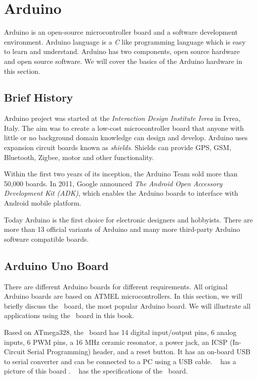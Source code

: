 \section {Arduino}
Arduino is an open-source microcontroller board and a software
development environment. Arduino language is a \emph{C} like
programming language which is easy to learn and understand.  Arduino
has two components, open source hardware and open source software.  We
will cover the basics of the Arduino hardware in this section.

\subsection{Brief History}
Arduino project was started at the \emph{Interaction Design Institute
  Ivrea} in Ivrea, Italy. The aim was to create a low-cost
microcontroller board that anyone with little or no background domain
knowledge can design and develop. Arduino uses expansion circuit
boards known as \emph{shields}. Shields can provide GPS, GSM,
Bluetooth, Zigbee, motor and other functionality.

Within the first two years of its inception, the Arduino Team sold
more than 50,000 boards. In 2011, Google announced \emph{The Android
  Open Accessory Development Kit (ADK)}, which enables the Arduino boards to
interface with Android mobile platform.

Today Arduino is the first choice for electronic designers and
hobbyists. There are  more than 13 official variants of Arduino and
many more third-party Arduino software compatible boards.

\subsection{Arduino Uno Board}
There are different Arduino boards for different requirements. All
original Arduino boards are based on ATMEL microcontrollers.  In this
section, we will briefly discuss the \arduino\ board, the most popular
Arduino board.  We will illustrate all applications using the
\arduino\ board in this book.

Based on ATmega328, the \arduino\ board has 14 digital input/output
pins, 6 analog inputs, 6 PWM pins, a 16 MHz ceramic resonator, a power
jack, an ICSP (In-Circuit Serial Programming) header, and a reset
button. It has an on-board USB to serial converter and can be connected
to a PC using a USB cable.   has a picture of this board
\cite{uno-ref}.   has the specifications of the
\arduino\ board.


